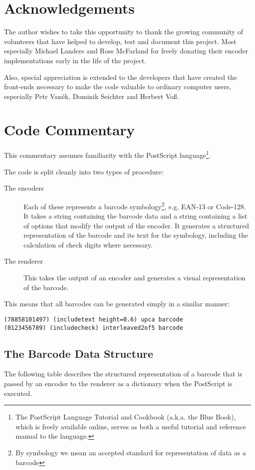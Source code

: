 \documentclass []{article}
\begin{document}
\section*{Acknowledgements}
The author wishes to take this opportunity to thank the growing 
community of volunteers that have helped to develop, test
and document this project. Most especially Michael Landers and 
Ross McFarland for freely donating their encoder implementations
early in the life of the project.

Also, special appreciation is extended to the developers that
have created the front-ends necessary to make the code valuable
to ordinary computer users, especially Petr Van\v{e}k, Dominik 
Seichter and Herbert Vo\ss.

\newpage

\section{Code Commentary}
This commentary assumes familiarity with the PostScript
language\footnote{The PostScript Language Tutorial and Cookbook 
(a.k.a. the Blue Book), which is freely available online, serves 
as both a useful tutorial and reference manual to the language.}.
 
The code is split cleanly into two types of procedure:

\begin{description}
\item[The encoders]{Each of these represents a barcode 
symbology\footnote{By symbology we mean an accepted standard for
representation of data as a barcode},
e.g. EAN-13 or Code-128. It takes a string containing the barcode
data and a string containing a list of options that modify the
output of the encoder. It generates
a structured representation of the barcode and its text for the 
symbology, including the calculation of check digits where necessary.}
\item[The renderer]{This takes the output of an encoder and 
generates a visual representation of the barcode.}
\end{description}

This means that all barcodes can be generated simply in a similar
manner:

\begin{verbatim}
(78858101497) (includetext height=0.6) upca barcode
(0123456789) (includecheck) interleaved2of5 barcode
\end{verbatim}


\subsection{The Barcode Data Structure}
\label{datastructure}
The following table describes the structured representation of a
barcode that is passed by an encoder to the renderer as a
dictionary when the PostScript is executed.
\end{document}
